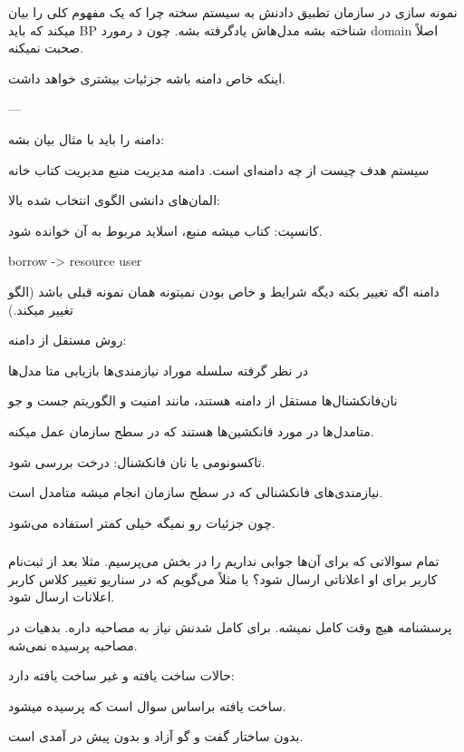 نمونه سازی در سازمان تطبیق دادنش به سیستم سخته چرا که یک مفهوم کلی را بیان میکند
که باید BP شناخته بشه مدل‌هاش یادگرفته بشه. چون د رمورد domain اصلاً صحبت
نمیکنه.

اینکه خاص دامنه باشه جزئیات بیشتری خواهد داشت.

---
 
دامنه را باید با مثال بیان بشه:

سیستم هدف چیست از چه دامنه‌ای است. دامنه مدیریت منبع
مدیریت کتاب خانه

المان‌های دانشی الگوی انتخاب شده بالا:

کانسپت: کتاب میشه منبع، 
اسلاید مربوط به آن خوانده شود.

borrow -> resource user

دامنه اگه تغییر بکنه دیگه شرایط و خاص بودن نمیتونه همان نمونه قبلی باشد (الگو
تغییر میکند.)

روش مستقل از دامنه:

در نظر گرفته سلسله موراد نیازمندی‌ها
بازیابی متا مدل‌ها

نان‌فانکشنال‌ها مستقل از دامنه هستند، مانند امنیت و الگوریتم جست و جو

متامدل‌ها در مورد فانکشین‌ها هستند که در سطح سازمان عمل میکنه.

تاکسونومی یا نان فانکشنال:
درخت بررسی شود.

نیازمندی‌های فانکشنالی که در سطح سازمان انجام میشه متامدل است.

چون جزئیات رو نمیگه خیلی کمتر استفاده می‌شود.


\subsubsection{}

تمام سوالاتی که برای آن‌ها جوابی نداریم را در بخش  می‌پرسیم. مثلا
بعد از ثبت‌نام کاربر برای او اعلاناتی ارسال شود؟ یا مثلاً می‌گویم که در سناریو
تغییر کلاس کاربر اعلانات ارسال شود.

پرسشنامه هیچ وقت کامل نمیشه. برای کامل شدنش نیاز به مصاحبه داره. بدهیات در
مصاحبه پرسیده نمی‌شه.

حالات ساخت یافته و غیر ساخت یافته دارد:

ساخت یافته براساس سوال است که پرسیده میشود.

بدون ساختار گفت و گو آزاد و بدون پیش در آمدی است.

\subsubsection{}

